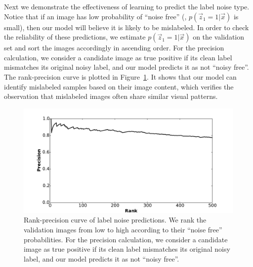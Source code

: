Next we demonstrate the effectiveness of learning to predict the label noise type. Notice that if an image has low probability of ``noise free'' (\ie, $p(\vec{z}_1=1|\vec{x})$ is small), then our model will believe it is likely to be mislabeled. In order to check the reliability of these predictions, we estimate $p(\vec{z}_1=1|\vec{x})$ on the validation set and sort the images accordingly in ascending order. For the precision calculation, we consider a candidate image as true positive if its clean label mismatches its original noisy label, and our model predicts it as not ``noisy free''. The rank-precision curve is plotted in Figure~\ref{fig:nl-noise-prediction-rp}. It shows that our model can identify mislabeled samples based on their image content, which verifies the observation that mislabeled images often share similar visual patterns.

\begin{figure}[t]
\begin{center}
\includegraphics[width=1.0\linewidth]{figures/noisy_labels/noise_prediction_rank_precision.pdf}
\end{center}
\caption{Rank-precision curve of label noise predictions. We rank the validation images from low to high according to their ``noise free'' probabilities. For the precision calculation, we consider a candidate image as true positive if its clean label mismatches its original noisy label, and our model predicts it as not ``noisy free''.}
\label{fig:nl-noise-prediction-rp}
\end{figure}

